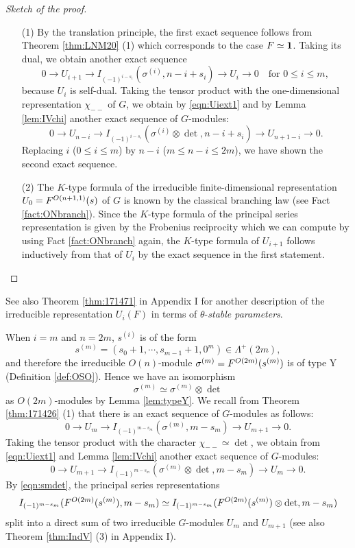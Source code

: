 \begin{proof}
[Sketch of the proof]
\begin{enumerate}
\item[(1)]
By the translation principle,
 the first exact sequence follows from Theorem \ref{thm:LNM20} (1)
 which corresponds to the case $F \simeq {\bf{1}}$.  
Taking its dual, 
 we obtain another exact sequence
\[
  0 \to U_{i+1} \to I_{(-1)^{i-s_i}}(\sigma^{(i)}, n-i+s_i)
    \to U_i \to 0
\quad
  \text{for $0 \le i \le m$, }
\]
because $U_i$ is self-dual.  
Taking the tensor product with the one-dimensional representation $\chi_{--}$ of $G$, 
 we obtain by \eqref{eqn:Uiext1} and by Lemma \ref{lem:IVchi}
 another exact sequence of $G$-modules:
\[
  0 \to U_{n-i} \to I_{(-1)^{i-s_i}}(\sigma^{(i)}\otimes \det, n-i+s_i)
    \to U_{n+1-i} \to 0.  
\]
Replacing $i$ ($0 \le i \le m$)
 by $n-i$ ($m \le n-i \le 2m$), 
 we have shown the second exact sequence.  
\item[(2)]
The $K$-type formula of the irreducible finite-dimensional representation 
 $U_0=F^{{O(n+1,1)}}({s})$ of $G$ is known by the classical branching law
 (see Fact \ref{fact:ONbranch}).  
Since the $K$-type formula of the principal series representation
 is given by the Frobenius reciprocity
 which we can compute by using Fact \ref{fact:ONbranch} again,
 the $K$-type formula of $U_{i+1}$ follows inductively from that of $U_i$
 by the exact sequence 
 in the first statement.  
\end{enumerate}
\end{proof}
See also Theorem \ref{thm:171471} in Appendix I
 for another description of the irreducible representation $U_i(F)$
 in terms of $\theta$-{\it{stable parameters}}.  



\begin{remark}
\label{rem:Utemp}
When $i=m$ and $n=2m$, 
 $s^{(i)}$ is of the form
\[
  s^{(m)} =(s_0+1, \cdots, s_{m-1}+1, 0^m) \in \Lambda^+(2m), 
\]
and therefore
 the irreducible $O(n)$-module 
$\sigma^{(m)}=F^{{O(2m)}}({s^{(m)}})$ is of type Y
 (Definition \ref{def:OSO}).  
Hence we have an isomorphism
\begin{equation}
\label{eqn:smdet}
    \sigma^{(m)} \simeq \sigma^{(m)} \otimes \det
\end{equation}
 as $O(2m)$-modules by Lemma \ref{lem:typeY}.  
We recall from Theorem \ref{thm:171426} (1)
 that there is an exact sequence of $G$-modules as follows:
\[
  0 \to U_m \to I_{(-1)^{m-s_m}}(\sigma^{(m)}, m-s_m) \to U_{m+1} \to 0.  
\]
Taking the tensor product with the character $\chi_{--} \simeq \det$, 
 we obtain from \eqref{eqn:Uiext1} and Lemma \ref{lem:IVchi}
 another exact sequence of $G$-modules:
\[
  0 \to U_{m+1} \to I_{(-1)^{m-s_m}}(\sigma^{(m)}\otimes \det, m-s_m)
 \to U_{m} \to 0.  
\]
By \eqref{eqn:smdet}, 
 the principal series representations 
\[
I_{(-1)^{m-s_m}}(F^{{O(2m)}}({s^{(m)}}), m-s_m)
\simeq
I_{(-1)^{m-s_m}}(F^{{O(2m)}}({s^{(m)}})\otimes \det, m-s_m)
\]
 split into a direct sum
 of two irreducible $G$-modules $U_m$ and $U_{m+1}$
 (see also Theorem \ref{thm:IndV} (3) in Appendix I).  
\end{remark}

